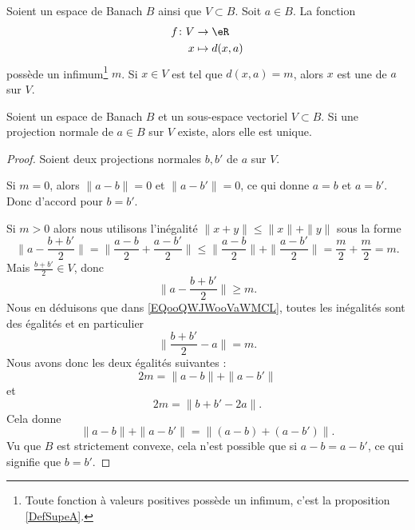 \begin{definition}      \label{DEFooMYYLooJyACPL}
    Soient un espace de Banach \( B\) ainsi que \( V\subset B\). Soit \( a\in B\). La fonction
    \begin{equation}
        \begin{aligned}
            f\colon V&\to \eR \\
            x&\mapsto d(x,a) 
        \end{aligned}
    \end{equation}
    possède un infimum\footnote{Toute fonction à valeurs positives possède un infimum, c'est la proposition \ref{DefSupeA}.} \( m\). Si \( x\in V\) est tel que \( d(x,a)=m\), alors \( x\) est une  de \( a\) sur \( V\).
\end{definition}

\begin{proposition}       \label{PROPooDKXVooUoYPgz}
    Soient un espace de Banach \( B\) et un sous-espace vectoriel \( V\subset B\). Si une projection normale de \( a\in B\) sur \( V\) existe, alors elle est unique.
\end{proposition}

\begin{proof}
    Soient deux projections normales \( b,b'\) de \( a\) sur \( V\).

    Si \( m=0\), alors \( \| a-b \|=0\) et \( \| a-b' \|=0\), ce qui donne \( a=b\) et \( a=b'\). Donc d'accord pour \( b=b'\).

    Si \( m>0\) alors nous utilisons l'inégalité \( \| x+y \|\leq \| x \|+\| y \|\) sous la forme
    \begin{equation}        \label{EQooQWJWooVaWMCL}
        \| a-\frac{ b+b' }{ 2 } \|=\| \frac{ a-b }{2}+\frac{ a-b' }{2} \|\leq \| \frac{ a-b }{2} \|+\| \frac{ a-b' }{2} \|=\frac{ m }{ 2 }+\frac{ m }{2}=m.
    \end{equation}
    Mais \( \frac{ b+b' }{2}\in V\), donc
    \begin{equation}
        \| a-\frac{ b+b' }{2} \|\geq m.
    \end{equation}
    Nous en déduisons que dans \eqref{EQooQWJWooVaWMCL}, toutes les inégalités sont des égalités et en particulier
    \begin{equation}
        \| \frac{ b+b' }{2}-a \|=m.
    \end{equation}
    Nous avons donc les deux égalités suivantes :
    \begin{equation}
        2m=\| a-b \|+\| a-b' \|
    \end{equation}
    et
    \begin{equation}
        2m=\| b+b'-2a \|.
    \end{equation}
    Cela donne
    \begin{equation}
        \| a-b \|+\| a-b' \|=\| (a-b)+(a-b') \|.
    \end{equation}
    Vu que \( B\) est strictement convexe, cela n'est possible que si \( a-b=a-b'\), ce qui signifie que \( b=b'\).
\end{proof}

